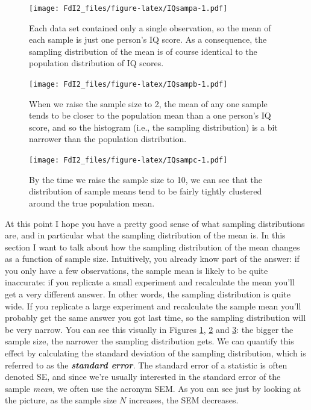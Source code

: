 \documentclass[spanish,]{book}
\begin{document}
\begin{figure}
\centering
\texttt{[image: FdI2\_files/figure-latex/IQsampa-1.pdf]}
\caption{\label{fig:IQsampa}Each data set contained only a single
observation, so the mean of each sample is just one person's IQ score.
As a consequence, the sampling distribution of the mean is of course
identical to the population distribution of IQ scores.}
\end{figure}

\begin{figure}
\centering
\texttt{[image: FdI2\_files/figure-latex/IQsampb-1.pdf]}
\caption{\label{fig:IQsampb}When we raise the sample size to 2, the mean of
any one sample tends to be closer to the population mean than a one
person's IQ score, and so the histogram (i.e., the sampling
distribution) is a bit narrower than the population distribution.}
\end{figure}

\begin{figure}
\centering
\texttt{[image: FdI2\_files/figure-latex/IQsampc-1.pdf]}
\caption{\label{fig:IQsampc}By the time we raise the sample size to 10, we
can see that the distribution of sample means tend to be fairly tightly
clustered around the true population mean.}
\end{figure}

At this point I hope you have a pretty good sense of what sampling
distributions are, and in particular what the sampling distribution of
the mean is. In this section I want to talk about how the sampling
distribution of the mean changes as a function of sample size.
Intuitively, you already know part of the answer: if you only have a few
observations, the sample mean is likely to be quite inaccurate: if you
replicate a small experiment and recalculate the mean you'll get a very
different answer. In other words, the sampling distribution is quite
wide. If you replicate a large experiment and recalculate the sample
mean you'll probably get the same answer you got last time, so the
sampling distribution will be very narrow. You can see this visually in
Figures \ref{fig:IQsampa}, \ref{fig:IQsampb} and \ref{fig:IQsampc}: the
bigger the sample size, the narrower the sampling distribution gets. We
can quantify this effect by calculating the standard deviation of the
sampling distribution, which is referred to as the
\textbf{\emph{standard error}}. The standard error of a statistic is
often denoted SE, and since we're usually interested in the standard
error of the sample \emph{mean}, we often use the acronym SEM. As you
can see just by looking at the picture, as the sample size \(N\)
increases, the SEM decreases.
\end{document}
